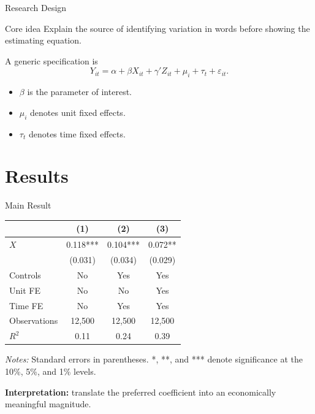 \documentclass[10pt,aspectratio=169]{beamer}
\begin{document}
\begin{frame}{Research Design}
\begin{block}{Core idea}
Explain the source of identifying variation in words before showing the estimating equation.
\end{block}

\vspace{0.6em}
A generic specification is
\[
  Y_{it} = \alpha + \beta X_{it} + \gamma' Z_{it} + \mu_i + \tau_t + \varepsilon_{it}.
\]

\begin{itemize}
  \item $\beta$ is the parameter of interest.
  \item $\mu_i$ denotes unit fixed effects.
  \item $\tau_t$ denotes time fixed effects.
\end{itemize}
\end{frame}

\section{Results}

\begin{frame}{Main Result}
\centering
\small
\begin{threeparttable}
\begin{tabular}{lccc}
\toprule
 & (1) & (2) & (3) \\
\midrule
$X$ & 0.118*** & 0.104*** & 0.072** \\
    & (0.031)  & (0.034)  & (0.029) \\
\addlinespace
Controls      & No  & Yes & Yes \\
Unit FE       & No  & No  & Yes \\
Time FE       & No  & Yes & Yes \\
Observations  & 12,500 & 12,500 & 12,500 \\
$R^2$         & 0.11 & 0.24 & 0.39 \\
\bottomrule
\end{tabular}
\begin{tablenotes}\scriptsize
\item \textit{Notes:} Standard errors in parentheses. *, **, and *** denote significance at the 10\%, 5\%, and 1\% levels.
\end{tablenotes}
\end{threeparttable}

\vspace{0.7em}
\textbf{Interpretation:} translate the preferred coefficient into an economically meaningful magnitude.
\end{frame}
\end{document}
